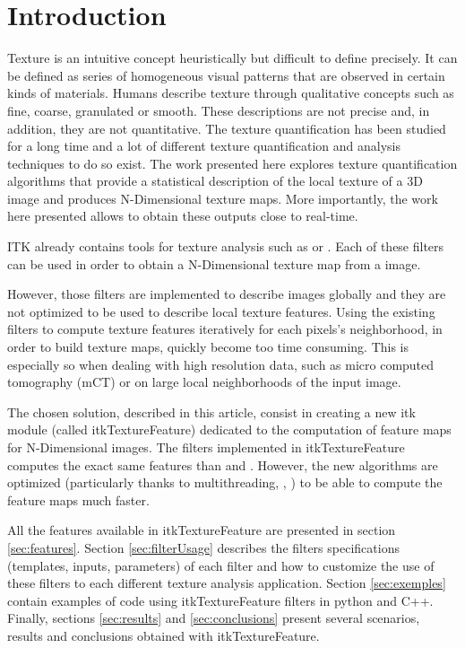 \documentclass{InsightArticle}
\newcommand{\IJhandlerIDnumber}{1338}
\begin{document}
\IJhandlenote{\IJhandlerIDnumber}
\newpage
\tableofcontents
\newpage
\section{Introduction}
\label{sec:intro}

Texture is an intuitive concept heuristically but difficult to define precisely. It can be defined as series of homogeneous visual patterns that are observed in certain kinds of materials. Humans describe texture through qualitative concepts such as fine, coarse, granulated or smooth. These descriptions are not precise and, in addition, they are not quantitative. The texture quantification has been studied for a long time and a lot of different texture quantification and analysis techniques to do so exist. The work presented here explores texture quantification algorithms that provide a statistical description of the local texture of a 3D image and produces N-Dimensional texture maps. More importantly, the work here presented allows to obtain these outputs close to real-time.

ITK already contains tools for texture analysis such as  or . Each of these filters can be used in order to obtain a N-Dimensional texture map from a image.

However, those filters are implemented to describe images globally and they are not optimized to be used to describe local texture features. Using the existing filters to compute texture features iteratively for each pixels's neighborhood, in order to build texture maps, quickly become too time consuming. This is especially so when dealing with high resolution data, such as micro computed tomography (mCT) or on large local neighborhoods of the input image.

The chosen solution, described in this article, consist in creating a new itk module (called itkTextureFeature) dedicated to the computation of feature maps for N-Dimensional images. The filters implemented in itkTextureFeature computes the exact same features than  and . However, the new algorithms are optimized (particularly thanks to multithreading, , ) to be able to compute the feature maps much faster.

All the features available in itkTextureFeature are presented in section \ref{sec:features}. Section \ref{sec:filterUsage} describes the filters specifications (templates, inputs, parameters) of each filter and how to customize the use of these filters to each different texture analysis application. Section \ref{sec:exemples} contain examples of code using itkTextureFeature filters in python and C++. Finally, sections \ref{sec:results} and \ref{sec:conclusions} present several scenarios, results and conclusions obtained with itkTextureFeature.
\newpage
\end{document}
